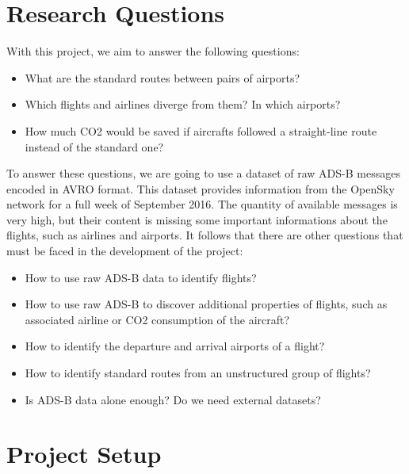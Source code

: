 \documentclass{vldb}
\begin{document}
\section{Research Questions}

With this project, we aim to answer the following questions:

\begin{itemize}
  \item What are the standard routes between pairs of airports?
  \item Which flights and airlines diverge from them? In which airports?
  \item How much CO2 would be saved if aircrafts followed a straight-line route
  instead of the standard one?
\end{itemize}

To answer these questions, we are going to use a dataset of raw ADS-B messages
encoded in AVRO format. This dataset provides information from the OpenSky
network for a full week of September 2016. 
The quantity of available messages is very high, but their content is missing
some important informations about the flights, such as airlines and airports. It
follows that there are other questions that must be faced in the development of
the project:

\begin{itemize}
  \item How to use raw ADS-B data to identify flights?
  \item How to use raw ADS-B to discover additional properties of flights, such
  as associated airline or CO2 consumption of the aircraft?
  \item How to identify the departure and arrival airports of a flight?
  \item How to identify standard routes from an unstructured group of flights?
  \item Is ADS-B data alone enough? Do we need external datasets?
\end{itemize}

\section{Project Setup}
\end{document}
